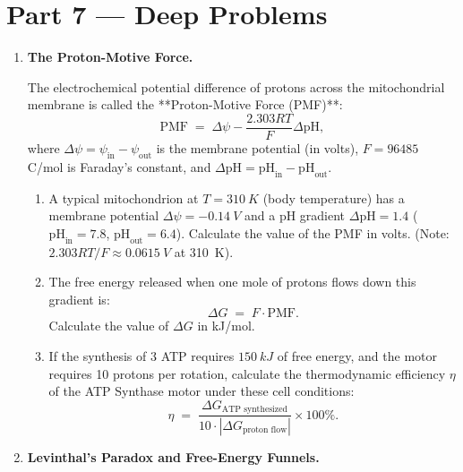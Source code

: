 \documentclass[12pt, a4paper]{book}
\begin{document}
\section{Part 7 --- Deep Problems}

\begin{deepbox}
\begin{enumerate}[label=\textbf{D\arabic*.}]
  \item \textbf{The Proton-Motive Force.}
  
        The electrochemical potential difference of protons across the mitochondrial membrane is called the **Proton-Motive Force (PMF)**:
        \[
          \text{PMF} \;=\; \Delta\psi - \frac{2.303 R T}{F} \Delta\text{pH},
        \]
        where $\Delta\psi = \psi_{\text{in}} - \psi_{\text{out}}$ is the membrane potential (in volts), $F = 96485$ C/mol is Faraday's constant, and $\Delta\text{pH} = \text{pH}_{\text{in}} - \text{pH}_{\text{out}}$.
        \begin{enumerate}[label=(\alph*)]
          \item A typical mitochondrion at $T = \SI{310}{K}$ (body temperature) has a membrane potential $\Delta\psi = -\SI{0.14}{V}$ and a pH gradient $\Delta\text{pH} = 1.4$ ($\text{pH}_{\text{in}} = 7.8$, $\text{pH}_{\text{out}} = 6.4$).
                Calculate the value of the PMF in volts. (Note: $2.303 RT/F \approx \SI{0.0615}{V}$ at \SI{310}{K}).
          \item The free energy released when one mole of protons flows down this gradient is:
                \[
                  \Delta G \;=\; F \cdot \text{PMF}.
                \]
                Calculate the value of $\Delta G$ in kJ/mol.
          \item If the synthesis of 3 ATP requires $\SI{150}{kJ}$ of free energy, and the motor requires 10 protons per rotation, calculate the thermodynamic efficiency $\eta$ of the ATP Synthase motor under these cell conditions:
                \[
                  \eta \;=\; \frac{\Delta G_{\text{ATP synthesized}}}{10 \cdot |\Delta G_{\text{proton flow}}|} \times 100\%.
                \]
        \end{enumerate}

  \item \textbf{Levinthal's Paradox and Free-Energy Funnels.}
  

\end{enumerate}
\end{deepbox}
\end{document}
